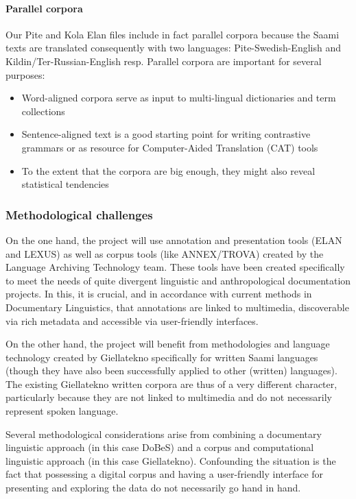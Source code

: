 \documentclass[a4paper,12pt]{article}
\begin{document}
\paragraph{Parallel corpora}
Our Pite and Kola Elan files include in fact parallel corpora because the Saami texts are translated consequently with two languages: Pite-Swedish-English and Kildin/Ter-Russian-English resp. Parallel corpora are important for several purposes:
\begin{itemize}
\item Word-aligned corpora serve as input to multi-lingual dictionaries and term collections
\item Sentence-aligned text is a good starting point for writing contrastive grammars or as resource for
Computer-Aided Translation (CAT) tools 
\item To the extent that the corpora are big enough, they might also reveal statistical tendencies
\end{itemize}

\subsubsection{Methodological challenges}
On the one hand, the project will use annotation and presentation tools (ELAN and LEXUS) as well as corpus tools (like ANNEX/TROVA) created by the Language Archiving Technology team. These tools have been created specifically to meet the needs of quite divergent linguistic and anthropological documentation projects. In this, it is crucial, and in accordance with current methods in Documentary Linguistics, that annotations are linked to multimedia, discoverable via rich metadata and accessible via user-friendly interfaces.

On the other hand, the project will benefit from methodologies and language technology created by Giellatekno specifically for written Saami languages (though they have also been successfully applied to other (written) languages). The existing Giellatekno written corpora are thus of a very different character, particularly because they are not linked to multimedia and do not necessarily represent spoken language.

Several methodological considerations arise from combining a documentary linguistic approach (in this case DoBeS) and a corpus and computational linguistic approach (in this case Giellatekno). Confounding the situation is the fact that possessing a digital corpus and having a user-friendly interface for presenting and exploring the data do not necessarily go hand in hand. 
\end{document}
